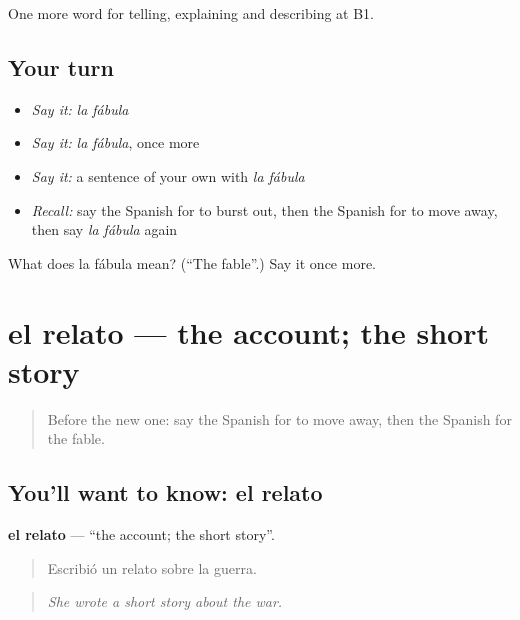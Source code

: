 \begin{grammarlens}[title={What you've built}]
One more word for telling, explaining and describing at B1.
\end{grammarlens}

\subsection*{Your turn}
\begin{itemize}
\raggedright
  \item \emph{Say it:} \emph{la fábula}
  \item \emph{Say it:} \emph{la fábula}, once more
  \item \emph{Say it:} a sentence of your own with \emph{la fábula}
  \item \emph{Recall:} say the Spanish for to burst out, then the Spanish for to move away, then say \emph{la fábula} again
\end{itemize}

\begin{tcolorbox}[breakable,colback=teal!4,colframe=teal!35!black,title={Before you move on}]
What does la fábula mean? (\textquotedblleft{}The fable\textquotedblright{}.) Say it once more.
\end{tcolorbox}
\section[el relato]{el relato — the account; the short story}

\label{lesson:ES-C563-relato}



\begin{quote}
Before the new one: say the Spanish for to move away, then the Spanish for the fable.
\end{quote}

\subsection*{You'll want to know: el relato}
\textbf{el relato} — \textquotedblleft{}the account; the short story\textquotedblright{}.

\begin{quote}
Escribió un relato sobre la guerra.
\end{quote}

\begin{quote}
\emph{She wrote a short story about the war.}
\end{quote}

